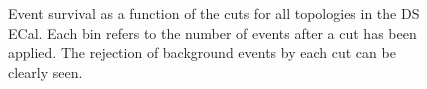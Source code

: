 \begin{figure}
\begin{minipage}{.5\linewidth}
\end{minipage}%
\begin{minipage}{.5\linewidth}
\centering
{}
\end{minipage}\par\medskip
\caption{Event survival as a function of the cuts for all topologies in the DS ECal.  Each bin refers to the number of events after a cut has been applied.  The rejection of background events by each cut can be clearly seen.}
\label{fig:SelEventSurvivalDS}
\end{figure}
\newline
\newline
